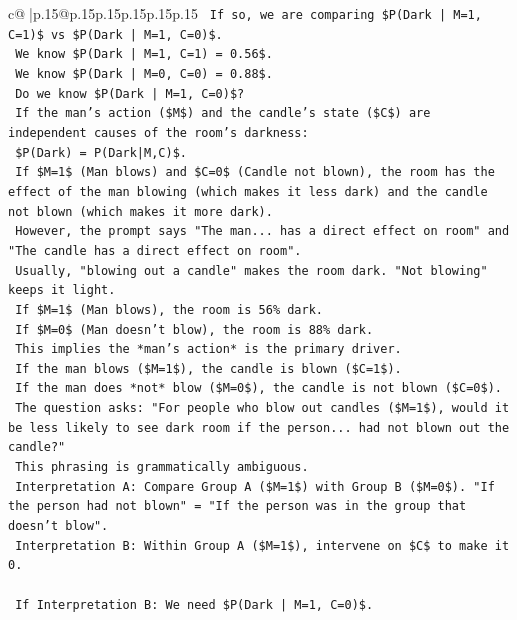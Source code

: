 \documentclass{article}
\begin{document}
{\begin{supertabular}{c@{$\;$}|p{.15\linewidth}@{}p{.15\linewidth}p{.15\linewidth}p{.15\linewidth}p{.15\linewidth}p{.15\linewidth}}
{{{\texttt{        If so, we are comparing \$P(Dark | M=1, C=1)\$ vs \$P(Dark | M=1, C=0)\$.} \\
\texttt{        We know \$P(Dark | M=1, C=1) = 0.56\$.} \\
\texttt{        We know \$P(Dark | M=0, C=0) = 0.88\$.} \\
\texttt{        Do we know \$P(Dark | M=1, C=0)\$?} \\
\texttt{        If the man's action (\$M\$) and the candle's state (\$C\$) are independent causes of the room's darkness:} \\
\texttt{        \$P(Dark) = P(Dark|M,C)\$.} \\
\texttt{        If \$M=1\$ (Man blows) and \$C=0\$ (Candle not blown), the room has the effect of the man blowing (which makes it less dark) and the candle not blown (which makes it more dark).} \\
\texttt{        However, the prompt says "The man... has a direct effect on room" and "The candle has a direct effect on room".} \\
\texttt{        Usually, "blowing out a candle" makes the room dark. "Not blowing" keeps it light.} \\
\texttt{        If \$M=1\$ (Man blows), the room is 56\% dark.} \\
\texttt{        If \$M=0\$ (Man doesn't blow), the room is 88\% dark.} \\
\texttt{        This implies the *man's action* is the primary driver.} \\
\texttt{        If the man blows (\$M=1\$), the candle is blown (\$C=1\$).} \\
\texttt{        If the man does *not* blow (\$M=0\$), the candle is not blown (\$C=0\$).} \\
\texttt{        The question asks: "For people who blow out candles (\$M=1\$), would it be less likely to see dark room if the person... had not blown out the candle?"} \\
\texttt{        This phrasing is grammatically ambiguous.} \\
\texttt{        Interpretation A: Compare Group A (\$M=1\$) with Group B (\$M=0\$). "If the person had not blown" = "If the person was in the group that doesn't blow".} \\
\texttt{        Interpretation B: Within Group A (\$M=1\$), intervene on \$C\$ to make it 0.} \\
\\ 
\texttt{        If Interpretation B: We need \$P(Dark | M=1, C=0)\$.} \\
}}}
\end{supertabular}}
\end{document}
